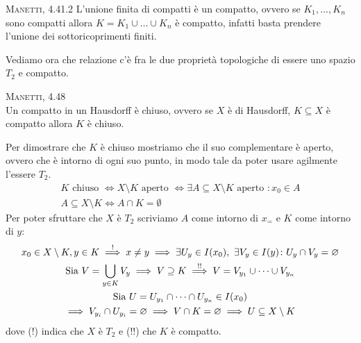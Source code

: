 \begin{observe}\textsc{Manetti, 4.41.2}
	L'unione finita di compatti è un compatto, ovvero se $K_1,\dots,K_n$ sono compatti allora $K=K_1\cup\dots\cup K_n$ è compatto, infatti basta prendere l'unione dei sottoricoprimenti finiti.
\end{observe}

Vediamo ora che relazione c'è fra le due proprietà topologiche di essere uno spazio $T_2$ e compatto.
\begin{theorema}\textsc{Manetti, 4.48} \label{compatto in hausdorff chiuso} \\ 
	Un compatto in un Hausdorff è chiuso, ovvero se $X$ è di Hausdorff, $K\subseteq X$ è compatto allora $K$ è chiuso.
\end{theorema}
\begin{demonstration}
	Per dimostrare che $K$ è chiuso mostriamo che il suo complementare è aperto, ovvero che è intorno di ogni suo punto, in modo tale da poter usare agilmente l'essere $T_2$.
		\begin{gather*}
			K \text{ chiuso } \iff X\setminus K \text{ aperto } \iff \exists A\subseteq X\setminus K \text{ aperto } \colon x_0\in A \\
			A\subseteq X\setminus K \iff A\cap K=\emptyset
		\end{gather*}
	Per poter sfruttare che $X$ è $T_2$ scriviamo $A$ come intorno di $x_=$ e $K$ come intorno di $y$:
		\begin{gather*}
			x_0\in X\setminus K, y\in K \stackrel{!}{\implies} x\neq y\implies \exists U_y\in I(x_0), \ \exists V_y\in I(y) \colon U_y\cap V_y=\varnothing \\
			\text{Sia } V=\mathop{{\bigcup}}\displaylimits_{y\in K}V_y \implies V\supseteq K \stackrel{!!}{\implies} V=V_{y_1}\cup\dots\cup V_{y_n} \\
			\text{Sia } U=U_{y_1}\cap\dots\cap U_{y_n} \in I(x_0)\\
			\implies V_{y_i}\cap U_{y_i}=\varnothing \implies V\cap K=\varnothing \implies U\subseteq X\setminus K
		\end{gather*}
	dove (!) indica che $X$ è $T_2$ e (!!) che $K$ è compatto.
\end{demonstration}

